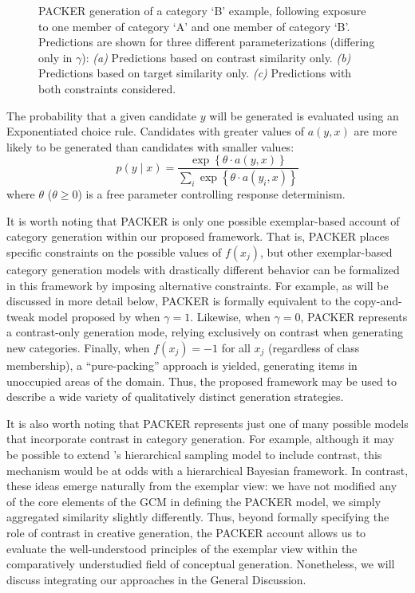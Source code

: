 \documentclass[12pt]{article}
\newcommand\inputpgf[2]{{
\let\pgfimageWithoutPath\pgfimage
\renewcommand{\pgfimage}[2][]{\pgfimageWithoutPath[##1]{#1/##2}}

}}
\begin{document}
\begin{flushleft}
\begin{figure}
	\begin{center}
		\inputpgf{figs/}{packer-examples.pgf}
		\caption{PACKER generation of a category `B' example, following exposure to one member of category `A' and one member of category `B'. Predictions are shown for three different parameterizations (differing only in $\gamma$): {\em (a)} Predictions based on contrast similarity only. {\em (b)} Predictions based on target similarity only.  {\em (c)} Predictions with both constraints considered.}
		\label{fig:packer-examples}
	\end{center}
\end{figure}

The probability that a given candidate $y$ will be generated is evaluated using an Exponentiated \citet{luce1977choice} choice rule. Candidates with greater values of $a(y,x)$ are more likely to be generated than candidates with smaller values:
% 
\begin{equation}
p(y \mid x) = \dfrac
{ \exp  \left \{ \theta \cdot a \left( y, x \right) \right \} } 
{ \sum_i{ \exp  \left \{ \theta \cdot a \left( y_i, x \right) \right\}  } }
\label{eq:packer-choice}
\end{equation}
% 
where $\theta$ ($\theta \geq 0$) is a free parameter controlling response determinism. 

It is worth noting that PACKER is only one possible exemplar-based account of category generation within our proposed framework. That is, PACKER places specific constraints on the possible values of $f(x_j)$, but other exemplar-based category generation models with drastically different behavior can be formalized in this framework by imposing alternative constraints. For example, as will be discussed in more detail below, PACKER is formally equivalent to the copy-and-tweak model proposed by \cite{jern2013probabilistic} when $\gamma = 1$. Likewise, when $\gamma = 0$, PACKER represents a contrast-only generation mode, relying exclusively on contrast when generating new categories. Finally, when $f(x_j) = -1$ for all $x_j$ (regardless of class membership), a ``pure-packing'' approach is yielded, generating items in unoccupied areas of the domain. Thus, the proposed framework may be used to describe a wide variety of qualitatively distinct generation strategies.


It is also worth noting that PACKER represents just one of many possible models that incorporate contrast in category generation. For example, although it may be possible to extend \cite{jern2013probabilistic}'s hierarchical sampling model to include contrast, this mechanism would be at odds with a hierarchical Bayesian framework. In contrast, these ideas emerge naturally from the exemplar view: we have not modified any of the core elements of the GCM in defining the PACKER model, we simply aggregated similarity slightly differently. Thus, beyond formally specifying the role of contrast in creative generation, the PACKER account allows us to evaluate the well-understood principles of the exemplar view within the comparatively understudied field of conceptual generation. Nonetheless, we will discuss integrating our approaches in the General Discussion.


\end{flushleft}
\end{document}
